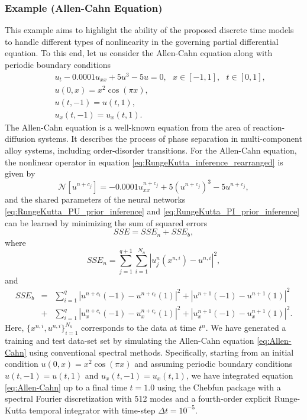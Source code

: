 \documentclass[preprint,12pt]{elsarticle}
\begin{document}
\subsubsection{Example (Allen-Cahn Equation)}
This example aims to highlight the ability of the proposed discrete time models to handle different types of nonlinearity in the governing partial differential equation. To this end, let us consider the Allen-Cahn equation along with periodic boundary conditions
\begin{eqnarray} \label{eq:Allen-Cahn}
&&u_t - 0.0001 u_{xx} + 5 u^3 - 5 u = 0, \ \ \ x \in [-1,1], \ \ \ t \in [0,1],\\
&&u(0, x) = x^2 \cos(\pi x),\nonumber\\
&&u(t,-1) = u(t,1),\nonumber\\
&&u_x(t,-1) = u_x(t,1).\nonumber
\end{eqnarray}
The Allen-Cahn equation is a well-known equation from the area of reaction-diffusion systems. It describes the process of phase separation in multi-component alloy systems, including order-disorder transitions. For the Allen-Cahn equation, the nonlinear operator in equation \eqref{eq:RungeKutta_inference_rearranged} is given by
\[
\mathcal{N}[u^{n+c_j}] = -0.0001 u^{n+c_j}_{xx} + 5 \left(u^{n+c_j}\right)^3 - 5 u^{n+c_j},
\]
and the shared parameters of the neural networks \eqref{eq:RungeKutta_PU_prior_inference} and \eqref{eq:RungeKutta_PI_prior_inference} can be learned by minimizing the sum of squared errors
\begin{equation}\label{eq:SSE_Allen-Cahn}
SSE = SSE_n + SSE_b,
\end{equation}
where
\[
SSE_n = \sum_{j=1}^{q+1} \sum_{i=1}^{N_n} |u^n_j(x^{n,i}) - u^{n,i}|^2,
\]
and
\begin{eqnarray*}
SSE_b &=& \sum_{i=1}^q |u^{n+c_i}(-1) - u^{n+c_i}(1)|^2 + |u^{n+1}(-1) - u^{n+1}(1)|^2 \\
      &+& \sum_{i=1}^q |u_x^{n+c_i}(-1) - u_x^{n+c_i}(1)|^2 + |u_x^{n+1}(-1) - u_x^{n+1}(1)|^2.
\end{eqnarray*}
Here, $\{x^{n,i}, u^{n,i}\}_{i=1}^{N_n}$ corresponds to the data at time $t^n$. We have generated a training and test data-set set by simulating the Allen-Cahn equation \eqref{eq:Allen-Cahn} using conventional spectral methods. Specifically, starting from an initial condition $u(0,x) = x^2 \cos(\pi x)$ and assuming periodic boundary conditions $u(t,-1) = u(t,1)$ and $u_x(t,-1) = u_x(t,1)$, we have integrated equation \eqref{eq:Allen-Cahn} up to a final time $t=1.0$ using the Chebfun package \cite{driscoll2014chebfun} with a spectral Fourier discretization with 512 modes and a fourth-order explicit Runge-Kutta temporal integrator with time-step $\Delta{t} = 10^{-5}$.\\
\end{document}
